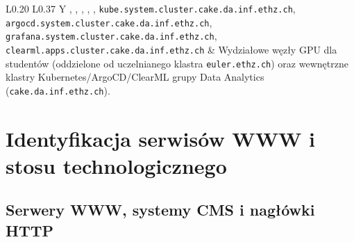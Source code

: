 {{\begin{table}[htbp]
\begin{tabularx}{\linewidth}{L{0.20\linewidth} L{0.37\linewidth} Y}
        , , , , , \nolinkurl{kube.system.cluster.cake.da.inf.ethz.ch}, \nolinkurl{argocd.system.cluster.cake.da.inf.ethz.ch}, \nolinkurl{grafana.system.cluster.cake.da.inf.ethz.ch}, \nolinkurl{clearml.apps.cluster.cake.da.inf.ethz.ch} &
        Wydziałowe węzły GPU dla studentów (oddzielone od uczelnianego klastra \nolinkurl{euler.ethz.ch}) oraz wewnętrzne klastry Kubernetes/ArgoCD/ClearML grupy Data Analytics (\nolinkurl{cake.da.inf.ethz.ch}). \\
        \bottomrule
    \end{tabularx}
\end{table}

\section{Identyfikacja serwisów WWW i stosu technologicznego}\label{sec:systemy-webowe}

\subsection{Serwery WWW, systemy CMS i nagłówki HTTP}\label{subsec:technologie-cms}

}}
